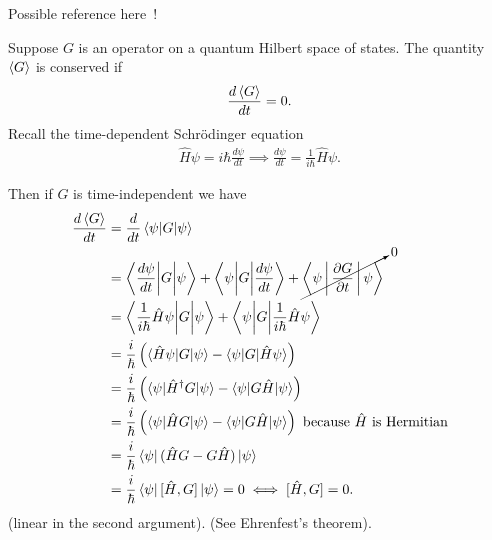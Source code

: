 
    Possible reference here~\cite{Hall2013}!
    
    Suppose $G$ is an operator on a quantum Hilbert space of states. The quantity $\braket{G}$ is conserved if
    \begin{align*}
        \frac{d\braket{G}}{dt} = 0.
    \end{align*}
    Recall the time-dependent Schr\"odinger equation
    \begin{align*}
        \hat{H}\psi = i\hbar\frac{d\psi}{dt} \implies \frac{d\psi}{dt} = \frac{1}{i\hbar}\hat{H}\psi.
    \end{align*}

    Then if $G$ is time-independent we have
    \begin{align*}
        \frac{d\braket{G}}{dt} &= \frac{d}{dt}\braket{\psi|G|\psi} \\
        &= \Braket{\frac{d\psi}{dt}\biggl|G\biggr|\psi} + \Braket{\psi\biggl|G\biggr|\frac{d\psi}{dt}} + \cancelto{0}{\Braket{\psi|\frac{\partial G}{\partial t}|\psi}} \\
        &= \Braket{\frac{1}{i\hbar}\hat{H}\psi\biggl|G\biggr|\psi} + \Braket{\psi\biggl|G\biggr|\frac{1}{i\hbar}\hat{H}\psi} \\
        &= \frac{i}{\hbar}\left( \braket{\hat{H}\psi|G|\psi} - \braket{\psi|G|\hat{H}\psi} \right) \\
        &= \frac{i}{\hbar}\left( \braket{\psi|\hat{H}^\dagger G|\psi} - \braket{\psi|G\hat{H}|\psi} \right) \\
        &= \frac{i}{\hbar}\left( \braket{\psi|\hat{H}G|\psi} - \braket{\psi|G\hat{H}|\psi} \right) \textrm{ because }\hat{H}\textrm{ is Hermitian} \\
        &= \frac{i}{\hbar}\bra{\psi}(\hat{H}G - G\hat{H})\ket{\psi} \\
        &= \frac{i}{\hbar}\bra{\psi}[\hat{H},G]\ket{\psi} = 0 \iff [\hat{H},G] = 0.
    \end{align*}
    (linear in the second argument). (See Ehrenfest's theorem).

